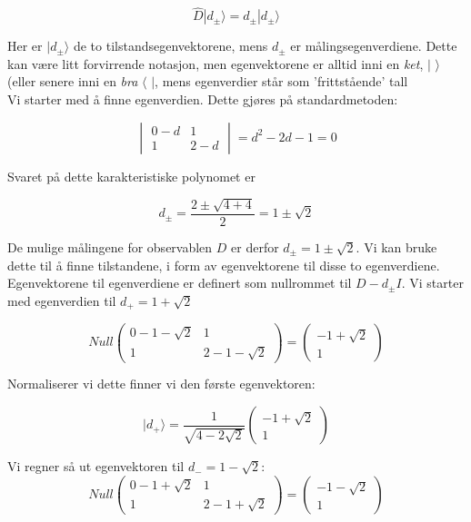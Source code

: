\documentclass[a4paper,norsk, 10pt]{article}
\numberwithin{equation}{section}
\begin{document}
$$
\hat{D}|d_{\pm}\rangle = d_{\pm}|d_{\pm}\rangle
$$

Her er $|d_{\pm}\rangle$ de to tilstandsegenvektorene, mens $d_{\pm}$ er målingsegenverdiene. Dette kan være litt forvirrende notasjon, men egenvektorene er alltid inni en \textit{ket}, $|$ $\rangle$(eller senere inni en \textit{bra} $\langle$ $|$, mens egenverdier står som  'frittstående' tall\\

Vi starter med å finne egenverdien. Dette gjøres på standardmetoden:

$$
\begin{vmatrix}
0 - d & 1\\
1 & 2-d
\end{vmatrix}
= d^2 - 2d - 1 = 0
$$

Svaret på dette karakteristiske polynomet er 

$$
d_{\pm} = \frac{2 \pm \sqrt{4 + 4}}{2} = 1\pm \sqrt{2}
$$

De mulige målingene for observablen $D$ er derfor $d_{\pm} = 1 \pm \sqrt{2}$. Vi kan bruke dette til å finne tilstandene, i form av egenvektorene til disse to egenverdiene. Egenvektorene til egenverdiene er definert som nullrommet til $D - d_{\pm}I$. Vi starter med egenverdien til $d_+ = 1 + \sqrt{2}$

$$
Null
\begin{pmatrix}
0 -1 - \sqrt{2} & 1\\
1 & 2 -1 - \sqrt{2}
\end{pmatrix}
= 
\begin{pmatrix}
-1 + \sqrt{2}\\
1
\end{pmatrix}
$$

Normaliserer vi dette finner vi den første egenvektoren:

\begin{equation}
|d_+\rangle = \frac{1}{\sqrt{4-2\sqrt{2}}}
\begin{pmatrix}
-1 + \sqrt{2}\\
1
\end{pmatrix}
\label{eq:d+}
\end{equation}


Vi regner så ut egenvektoren til $d_- = 1-\sqrt{2}$:
$$
Null
\begin{pmatrix}
0 -1 + \sqrt{2} & 1\\
1 & 2 -1 + \sqrt{2}
\end{pmatrix}
= 
\begin{pmatrix}
-1 - \sqrt{2}\\
1
\end{pmatrix}
$$
\end{document}
